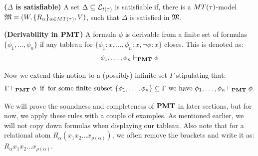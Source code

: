 \begin{definition}\label{sat of Gamma pure}
    \textbf{($\Delta$ is satisfiable)} A set $\Delta\subseteq\mathcal{L}_{t(\tau)}$ is satisfiable if, there is a $MT(\tau)$-model $\mathfrak{M} = (W,\{ R_{\alpha} \}_{\alpha \in MT(\tau)},V)$, such that $\Delta$ is satisfied in $\mathfrak{M}$.
\end{definition}

\begin{definition}\label{Derivability - Flat}
    \textbf{(Derivability in $\textbf{PMT}$)} A formula $\phi$ is derivable from a finite set of formulas $\{\phi_1,\ldots,\phi_n\}$ if any tableau for $\{ \phi_1:x , \ldots ,\phi_n:x, \neg \phi:x\}$ closes. This is denoted as:
    \begin{equation*}
        \phi_1 ,\ldots,\phi_n \vdash_{\textbf{PMT}} \phi
    \end{equation*}
    \par Now we extend this notion to a (possibly) infinite set $\Gamma$ stipulating that:
    \begin{equation*}
        \Gamma \vdash_{\textbf{PMT}} \phi \;\;\text{if}\;\; \text{for some finite subset } \{\phi_1,\ldots,\phi_n\} \subseteq \Gamma \text{ we have } \phi_1,\ldots,\phi_n \vdash_{\textbf{PMT}} \phi.
    \end{equation*}
\end{definition}

\par We will prove the soundness and completeness of $\textbf{PMT}$ in later sections, but for now, we apply these rules with a couple of examples.
As mentioned earlier, we will not copy down formulas when displaying our tableau. Also note that for a relational atom $R_\alpha(x_1x_2\ldots x_{\rho(\alpha)})$, we often remove the brackets and write it as: $R_\alpha x_1x_2\ldots x_{\rho(\alpha)}$.   